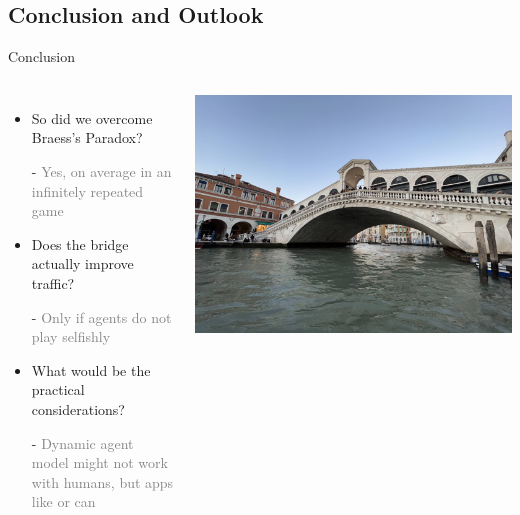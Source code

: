 \documentclass[aspectratio=169]{beamer}
\begin{document}
\subsection{Conclusion and Outlook}
\begin{frame}{Conclusion}




    \begin{columns}
        
        \begin{itemize}
            \item<+-> So did we overcome Braess's Paradox? 
            
            - \textcolor{gray}{Yes, on average in an infinitely repeated game}
            
            \item<+-> Does the bridge actually improve traffic? 
            
            - \textcolor{gray}{Only if agents do not play selfishly }
            
            \item<+-> What would be the practical considerations? 
            
            - \textcolor{gray}{Dynamic agent model might not work with humans, but apps like  or  can }
        \end{itemize}

            \includegraphics[width=\linewidth]{images/venice_bridge.jpg}
    \end{columns}
   
\end{frame}
\end{document}
